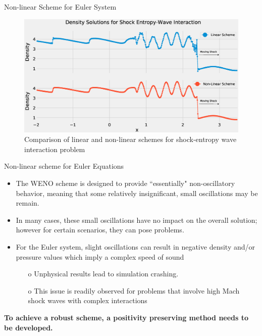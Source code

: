\documentclass[10pt]{beamer}
\begin{document}
\begin{frame}{Non-linear Scheme for Euler System}
  \begin{figure}[H]
    \centering
    \includegraphics[scale=0.25]{DensitySolutions.eps}\caption{Comparison of linear and non-linear schemes for shock-entropy wave interaction problem}
      \label{fig:ShockEntropy}
    \end{figure}
\end{frame}

\begin{frame}{Non-linear scheme for Euler Equations}
  \begin{itemize}
    \item The WENO scheme is designed to provide ``essentially" non-oscillatory behavior, meaning that some relatively insignificant, small oscillations may be remain.
    \item In many cases, these small oscillations have no impact on the overall solution; however for certain scenarios, they can pose problems.
    \item For the Euler system, slight oscillations can result in negative density and/or pressure values which imply a complex speed of sound
    \begin{itemize}
      \item[o] Unphysical results lead to simulation crashing.
      \item[o] This issue is readily observed for problems that involve high Mach shock waves with complex interactions
    \end{itemize}  
  \end{itemize}
  \textbf{To achieve a robust scheme, a positivity preserving method needs to be developed.}
\end{frame}
\end{document}
